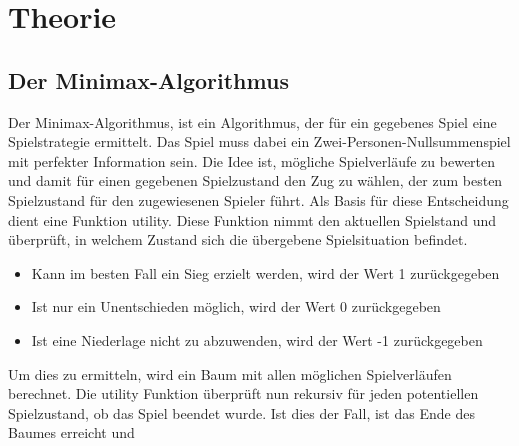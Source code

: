 \chapter{Theorie}
\section{Der Minimax-Algorithmus}

Der Minimax-Algorithmus, ist ein Algorithmus, der für ein gegebenes Spiel eine Spielstrategie ermittelt. 
Das Spiel muss dabei ein Zwei-Personen-Nullsummenspiel mit perfekter Information sein. Die Idee ist, mögliche 
Spielverläufe zu bewerten und damit für einen gegebenen Spielzustand den Zug zu wählen, der zum besten Spielzustand 
für den zugewiesenen Spieler führt. Als Basis für diese Entscheidung dient eine Funktion utility. Diese Funktion 
nimmt den aktuellen Spielstand und überprüft, in welchem Zustand sich die übergebene Spielsituation befindet. 

\begin{itemize}
    \item Kann im besten Fall ein Sieg erzielt werden, wird der Wert 1 zurückgegeben
    \item Ist nur ein Unentschieden möglich, wird der Wert 0 zurückgegeben
    \item Ist eine Niederlage nicht zu abzuwenden, wird der Wert -1 zurückgegeben
\end{itemize}

Um dies zu ermitteln, wird ein Baum mit allen möglichen Spielverläufen berechnet. Die utility Funktion überprüft 
nun rekursiv für jeden potentiellen Spielzustand, ob das Spiel beendet wurde. Ist dies der Fall, ist das 
Ende des Baumes erreicht und 